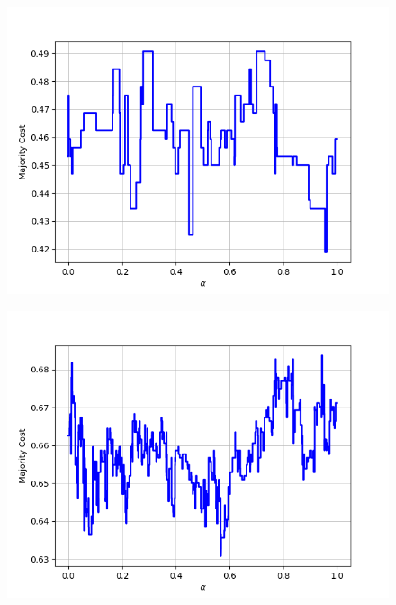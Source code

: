 \begin{figure}[H]
\begin{minipage}{.24\textwidth}
  {\includegraphics[width=\linewidth]{plots/omniglot-intra-ac-cnn/Hebrew}}
\end{minipage}
\begin{minipage}{.24\textwidth}
  \centering
  {\includegraphics[width=\linewidth]{plots/omniglot-intra-ac-cnn/Inuktitut_(Canadian_Aboriginal_Syllabics)}}
\end{minipage}
\begin{minipage}{.24\textwidth}
  \centering

\end{minipage}
\end{figure}

